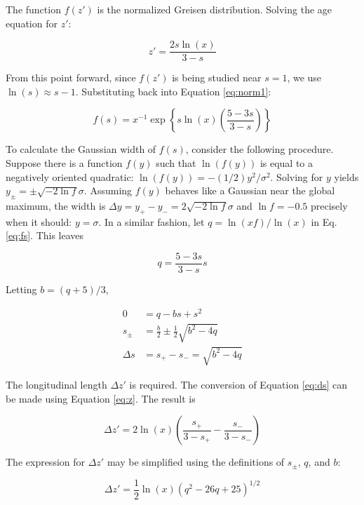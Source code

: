 \documentclass[amsmath,amssymb,aps,prd,10pt,twocolumn]{revtex4}
\begin{document}
The function $f(z')$ is the normalized Greisen distribution.  Solving the age equation for $z'$:

\begin{equation}
z' = \frac{2s\ln(x)}{3-s} \label{eq:z}
\end{equation}

From this point forward, since $f(z')$ is being studied near $s = 1$, we use $\ln(s) \approx s - 1$. Substituting back into Equation \ref{eq:norm1}:

\begin{equation}
f(s) = x^{-1} \exp \left \lbrace s \ln(x) \left( \frac{5 - 3 s}{3 - s} \right) \right \rbrace \label{eq:fs}
\end{equation}

To calculate the Gaussian width of $f(s)$, consider the following procedure.  Suppose there is a function $f(y)$ such that $\ln(f(y))$ is equal to a negatively oriented quadratic: $\ln(f(y)) = -(1/2) y^2/\sigma^2$.  Solving for $y$ yields $y_{\pm} = \pm \sqrt{-2 \ln f} \sigma$.  Assuming $f(y)$ behaves like a Gaussian near the global maximum, the width is $\Delta y = y_{+} - y_{-} = 2\sqrt{-2 \ln f} \sigma$ and $\ln f = -0.5$ precisely when it should: $y = \sigma$.  In a similar fashion, let $q = \ln(xf)/\ln(x)$ in Eq. \ref{eq:fs}.  This leaves

\begin{equation}
q = \frac{5-3s}{3-s}s
\end{equation}

Letting $b = (q+5)/3$,

\begin{align}
0 &= q - b s + s^2 \\
s_{\pm} &= \frac{b}{2} \pm \frac{1}{2} \sqrt{b^2 - 4 q} \\
\Delta s &= s_{+} - s_{-} = \sqrt{b^2 - 4 q} \label{eq:ds}
\end{align}

The longitudinal length $\Delta z'$ is required.  The conversion of Equation \ref{eq:ds} can be made using Equation \ref{eq:z}.  The result is

\begin{equation}
\Delta z' = 2 \ln(x) \left( \frac{s_{+}}{3-s_{+}} - \frac{s_{-}}{3-s_{-}} \right)
\end{equation}

The expression for $\Delta z'$ may be simplified using the definitions of $s_{\pm}$, $q$, and $b$:

\begin{equation}
\Delta z' = \frac{1}{2} \ln(x) (q^2 -26 q +25)^{1/2}
\end{equation}
\end{document}
